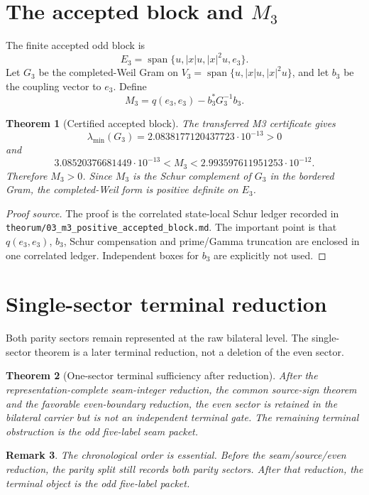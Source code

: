 \documentclass[11pt]{article}
\newtheorem{theorem}{Theorem}[section]
\newtheorem{remark}[theorem]{Remark}
\begin{document}
\section{The accepted block and \(M_3\)}

The finite accepted odd block is
\[
E_3=\operatorname{span}\{u, |x|u, |x|^2u, e_3\}.
\]
Let \(G_3\) be the completed-Weil Gram on \(V_3=\operatorname{span}\{u,|x|u,|x|^2u\}\), and let \(b_3\) be the coupling vector to \(e_3\).  Define
\[
M_3=q(e_3,e_3)-b_3^*G_3^{-1}b_3.
\]

\begin{theorem}[Certified accepted block]
The transferred M3 certificate gives
\[
\lambda_{\min}(G_3)=2.0838177120437723\cdot10^{-13}>0
\]
and
\[
3.08520376681449\cdot10^{-13}<M_3<2.993597611951253\cdot10^{-12}.
\]
Therefore \(M_3>0\).  Since \(M_3\) is the Schur complement of \(G_3\) in the bordered Gram, the completed-Weil form is positive definite on \(E_3\).
\end{theorem}

\begin{proof}[Proof source]
The proof is the correlated state-local Schur ledger recorded in \texttt{theorum/03\_m3\_positive\_accepted\_block.md}.  The important point is that \(q(e_3,e_3)\), \(b_3\), Schur compensation and prime/Gamma truncation are enclosed in one correlated ledger.  Independent boxes for \(b_3\) are explicitly not used.
\end{proof}

\section{Single-sector terminal reduction}

Both parity sectors remain represented at the raw bilateral level.  The single-sector theorem is a later terminal reduction, not a deletion of the even sector.

\begin{theorem}[One-sector terminal sufficiency after reduction]
After the representation-complete seam-integer reduction, the common source-sign theorem and the favorable even-boundary reduction, the even sector is retained in the bilateral carrier but is not an independent terminal gate.  The remaining terminal obstruction is the odd five-label seam packet.
\end{theorem}

\begin{remark}
The chronological order is essential.  Before the seam/source/even reduction, the parity split still records both parity sectors.  After that reduction, the terminal object is the odd five-label packet.
\end{remark}
\end{document}
